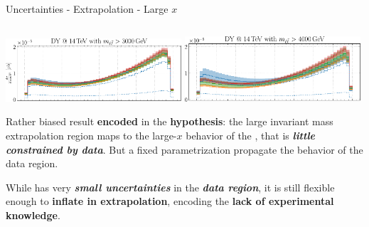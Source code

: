 \documentclass[9pt]{beamer}
\begin{document}
\begin{frame}{Uncertainties - Extrapolation - Large $x$}
    \begin{columns}
        \begin{column}{0.5\textwidth}
            \begin{tcolorbox}[size=small,sharpish corners,boxrule=0mm]
                \centering
                \includegraphics[width=0.49\textwidth]{NNPDF_DY_14TEV_BSM_AFB_COS_3000}
                \includegraphics[width=0.49\textwidth]{NNPDF_DY_14TEV_BSM_AFB_COS_4000}
            \end{tcolorbox}
            \vspace*{20pt}

            Rather biased result \textbf{encoded} in the \textbf{hypothesis}:
            the large invariant mass extrapolation region maps to the large-$x$
            behavior of the \pdf{}, that is \textit{\textbf{little constrained
            by data}}.
            But a fixed parametrization propagate the behavior of the data
            region.
            \vspace*{10pt}

            While  has very \textbf{\textit{small uncertainties}} in
            the \textbf{\textit{data region}}, it is still flexible enough to
            \textbf{inflate in extrapolation}, encoding the \alert{\textbf{lack
            of experimental knowledge}}.
            \vspace*{20pt}



\end{column}
\end{columns}
\end{frame}
\end{document}

